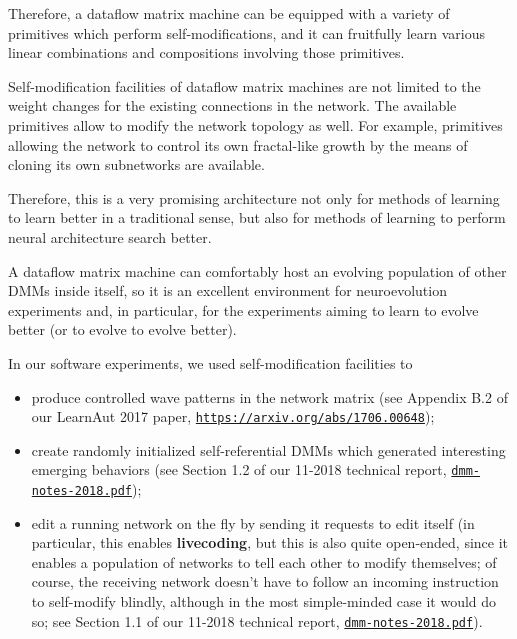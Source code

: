 \documentclass{article}
\begin{document}
Therefore, a dataflow matrix machine can be equipped with a variety of primitives
which perform self-modifications, and it can fruitfully learn various linear combinations and
compositions involving those primitives.

Self-modification facilities of dataflow matrix machines are not limited to the weight
changes for the existing connections in the network. The available primitives allow to
modify the network topology as well. For example, primitives allowing the network
to control its own fractal-like growth by the means of cloning its own subnetworks
are available.

Therefore, this is a very promising architecture not only for methods of learning to learn
better in a traditional sense, but also for methods of learning to perform
neural architecture search better. 

A dataflow matrix machine can comfortably host
an evolving population of other DMMs inside itself, so it is
an excellent environment for neuroevolution experiments and, in particular,
for the experiments aiming to learn to evolve better (or to evolve to evolve better).

\vspace{0.1in}
\noindent
In our software experiments, we used self-modification facilities to

  \begin{itemize}
     \item produce controlled wave patterns in the network matrix (see Appendix B.2 of our LearnAut 2017 paper, \href{https://arxiv.org/abs/1706.00648}{\tt https://arxiv.org/abs/1706.00648});
     \item create randomly initialized self-referential DMMs which generated interesting emerging behaviors (see Section 1.2 of our 11-2018 technical report, \href{https://www.cs.brandeis.edu/~bukatin/dmm-notes-2018.pdf}{\tt dmm-notes-2018.pdf});
     \item edit a running network on the fly by sending it requests to edit itself (in particular, this enables {\bf livecoding}, but this is also quite open-ended, since it enables a population of networks to tell each other to modify themselves; of course, the receiving network doesn't have to follow an incoming instruction to self-modify blindly, although in the most simple-minded case it would do so; see Section 1.1 of our 11-2018 technical report, \href{https://www.cs.brandeis.edu/~bukatin/dmm-notes-2018.pdf}{\tt dmm-notes-2018.pdf}).
  \end{itemize}
\end{document}
